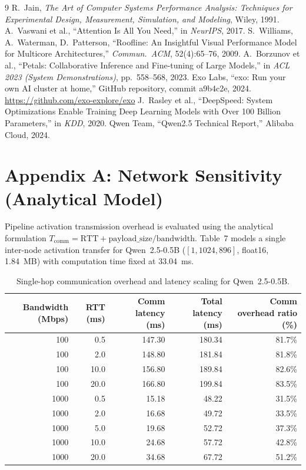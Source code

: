 \documentclass[10pt,a4paper]{article}
\renewcommand{\refname}{References}
\newcommand{\code}[1]{{\ttfamily\footnotesize #1}}
\begin{document}
\begingroup
\def\refname{References}
\def\bibname{References}
\begin{thebibliography}{9}\footnotesize
{} R.~Jain, \emph{The Art of Computer Systems Performance Analysis: Techniques for Experimental Design, Measurement, Simulation, and Modeling}, Wiley, 1991.
 A.~Vaswani et al., ``Attention Is All You Need,'' in \emph{NeurIPS}, 2017.
 S.~Williams, A.~Waterman, D.~Patterson, ``Roofline: An Insightful Visual Performance Model for Multicore Architectures,'' \emph{Commun.\ ACM}, 52(4):65--76, 2009.
 A.~Borzunov et al., ``Petals: Collaborative Inference and Fine-tuning of Large Models,'' in \emph{ACL 2023 (System Demonstrations)}, pp.~558--568, 2023.
 Exo Labs, ``exo: Run your own AI cluster at home,'' GitHub repository, commit \code{a9b4c2e}, 2024. \url{https://github.com/exo-explore/exo}
 J.~Rasley et al., ``DeepSpeed: System Optimizations Enable Training Deep Learning Models with Over 100 Billion Parameters,'' in \emph{KDD}, 2020.
 Qwen Team, ``Qwen2.5 Technical Report,'' Alibaba Cloud, 2024.
\end{thebibliography}
\endgroup

\appendix
\section*{Appendix A: Network Sensitivity (Analytical Model)}
Pipeline activation transmission overhead is evaluated using the analytical formulation $T_{\text{comm}} = \text{RTT} + \text{payload\_size} / \text{bandwidth}$. Table~7 models a single inter-node activation transfer for Qwen~2.5-0.5B ($[1, 1024, 896]$, float16, 1.84~MB) with computation time fixed at 33.04~ms.

\begin{table}[H]
\centering\footnotesize
\caption{Single-hop communication overhead and latency scaling for Qwen~2.5-0.5B.}
\begin{tabular}{@{}rrrrr@{}}
\toprule
Bandwidth (Mbps) & RTT (ms) & Comm latency (ms) & Total latency (ms) & Comm overhead ratio (\%)\\
\midrule
100 & 0.5 & 147.30 & 180.34 & 81.7\%\\
100 & 2.0 & 148.80 & 181.84 & 81.8\%\\
100 & 10.0 & 156.80 & 189.84 & 82.6\%\\
100 & 20.0 & 166.80 & 199.84 & 83.5\%\\
1000 & 0.5 & 15.18 & 48.22 & 31.5\%\\
1000 & 2.0 & 16.68 & 49.72 & 33.5\%\\
1000 & 5.0 & 19.68 & 52.72 & 37.3\%\\
1000 & 10.0 & 24.68 & 57.72 & 42.8\%\\
1000 & 20.0 & 34.68 & 67.72 & 51.2\%\\
\bottomrule
\end{tabular}
\end{table}
\end{document}
